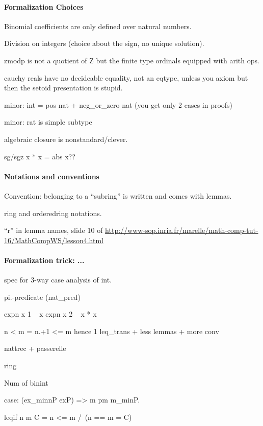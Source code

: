 \paragraph{Formalization Choices}

Binomial coefficients are only defined over natural numbers.

Division on integers (choice about the sign, no unique solution).

zmodp is not a quotient of Z but the finite type ordinals equipped with
arith ops.

cauchy reals have no decideable equality, not an eqtype, unless you axiom
but then the setoid presentation is stupid.

minor: int = pos nat + neg\_or\_zero nat (you get only 2 cases in proofs)

minor: rat is simple subtype

algebraic closure is nonstandard/clever.

sg/sgz x * x = abs x??

\paragraph{Notations and conventions}

Convention: belonging to a ``subring'' is written 
and comes with lemmas.

ring and orderedring notations.

``r'' in lemma names, slide 10 of
\url{http://www-sop.inria.fr/marelle/math-comp-tut-16/MathCompWS/lesson4.html}

\paragraph{Formalization trick: ...}

spec for 3-way case analysis of int.

pi.-predicate (nat\_pred)

expn x 1 ~ x
expn x 2 ~ x * x

n < m = n.+1 <= m hence 1 leq\_trans + less lemmas + more conv

nattrec + passerelle

ring

Num of binint

case: (ex\_minnP exP) => m pm m\_minP.

leqif n m C   =   n <= m /\ (n == m = C)
